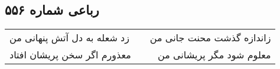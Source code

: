 \begin{center}
\section*{رباعی شماره ۵۵۶}
\label{sec:sh556}
\begin{longtable}{l p{0.5cm} r}
زد شعله به دل آتش پنهانی من
&&
زاندازه گذشت محنت جانی من
\\
معذورم اگر سخن پریشان افتاد
&&
معلوم شود مگر پریشانی من
\\
\end{longtable}
\end{center}
